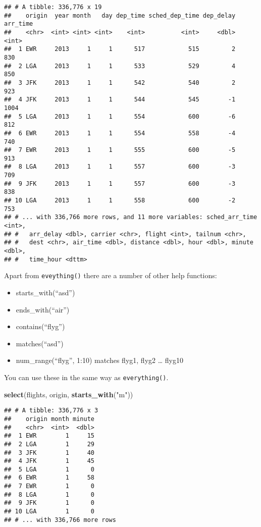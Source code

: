 \documentclass[]{book}
\newenvironment{Shaded}{\begin{snugshade}}{\end{snugshade}}
\newcommand{\KeywordTok}[1]{\textcolor[rgb]{0.13,0.29,0.53}{\textbf{#1}}}
\newcommand{\NormalTok}[1]{#1}
\newcommand{\StringTok}[1]{\textcolor[rgb]{0.31,0.60,0.02}{#1}}
\begin{document}
\begin{verbatim}
## # A tibble: 336,776 x 19
##    origin  year month   day dep_time sched_dep_time dep_delay arr_time
##    <chr>  <int> <int> <int>    <int>          <int>     <dbl>    <int>
##  1 EWR     2013     1     1      517            515         2      830
##  2 LGA     2013     1     1      533            529         4      850
##  3 JFK     2013     1     1      542            540         2      923
##  4 JFK     2013     1     1      544            545        -1     1004
##  5 LGA     2013     1     1      554            600        -6      812
##  6 EWR     2013     1     1      554            558        -4      740
##  7 EWR     2013     1     1      555            600        -5      913
##  8 LGA     2013     1     1      557            600        -3      709
##  9 JFK     2013     1     1      557            600        -3      838
## 10 LGA     2013     1     1      558            600        -2      753
## # ... with 336,766 more rows, and 11 more variables: sched_arr_time <int>,
## #   arr_delay <dbl>, carrier <chr>, flight <int>, tailnum <chr>,
## #   dest <chr>, air_time <dbl>, distance <dbl>, hour <dbl>, minute <dbl>,
## #   time_hour <dttm>
\end{verbatim}

Apart from \texttt{eveything()} there are a number of other help functions:

\begin{itemize}
\item
  starts\_with(``asd'')
\item
  ends\_with(``air'')
\item
  contains(``flyg'')
\item
  matches(``asd'')
\item
  num\_range(``flyg'', 1:10) matches flyg1, flyg2 \ldots{} flyg10
\end{itemize}

You can use these in the same way as \texttt{everything()}.

\begin{Shaded}
\begin{Highlighting}[]
\KeywordTok{select}\NormalTok{(flights, origin, }\KeywordTok{starts_with}\NormalTok{(}\StringTok{"m"}\NormalTok{))}
\end{Highlighting}
\end{Shaded}

\begin{verbatim}
## # A tibble: 336,776 x 3
##    origin month minute
##    <chr>  <int>  <dbl>
##  1 EWR        1     15
##  2 LGA        1     29
##  3 JFK        1     40
##  4 JFK        1     45
##  5 LGA        1      0
##  6 EWR        1     58
##  7 EWR        1      0
##  8 LGA        1      0
##  9 JFK        1      0
## 10 LGA        1      0
## # ... with 336,766 more rows
\end{verbatim}
\end{document}
